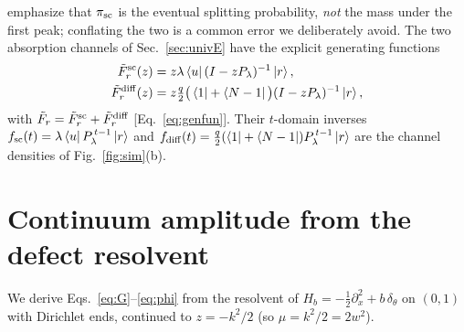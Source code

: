 \documentclass[reprint,amsmath,amssymb,aps,prresearch,longbibliography]{revtex4-2}
\begin{document}
emphasize that $\pi_{\rm sc}$ is the eventual splitting probability, \emph{not} the mass under the
first peak; conflating the two is a common error we deliberately avoid. The two absorption channels of
Sec.~\ref{sec:univE} have the explicit generating functions
\begin{align}
\tilde F^{\rm sc}_r(z)&=z\lambda\bra{u}(I-zP_\lambda)^{-1}\ket{r},\notag\\
\tilde F^{\rm diff}_r(z)&=z\tfrac q2\big(\bra{1}+\bra{N-1}\big)(I-zP_\lambda)^{-1}\ket{r},
\label{eq:genchan}
\end{align}
with $\tilde F_r=\tilde F^{\rm sc}_r+\tilde F^{\rm diff}_r$ [Eq.~\eqref{eq:genfun}]. Their $t$-domain
inverses $f_{\rm sc}(t)=\lambda\bra{u}P_\lambda^{\,t-1}\ket{r}$ and $f_{\rm diff}(t)=\tfrac
q2(\bra{1}+\bra{N-1})P_\lambda^{\,t-1}\ket{r}$ are the channel densities of Fig.~\ref{fig:sim}(b).

\section{Continuum amplitude from the defect resolvent}\label{app:amp}
We derive Eqs.~\eqref{eq:G}--\eqref{eq:phi} from the resolvent of $H_b=-\tfrac12\partial_x^2
+b\,\delta_\theta$ on $(0,1)$ with Dirichlet ends, continued to $z=-k^2/2$ (so $\mu=k^2/2=2w^2$).
\end{document}
